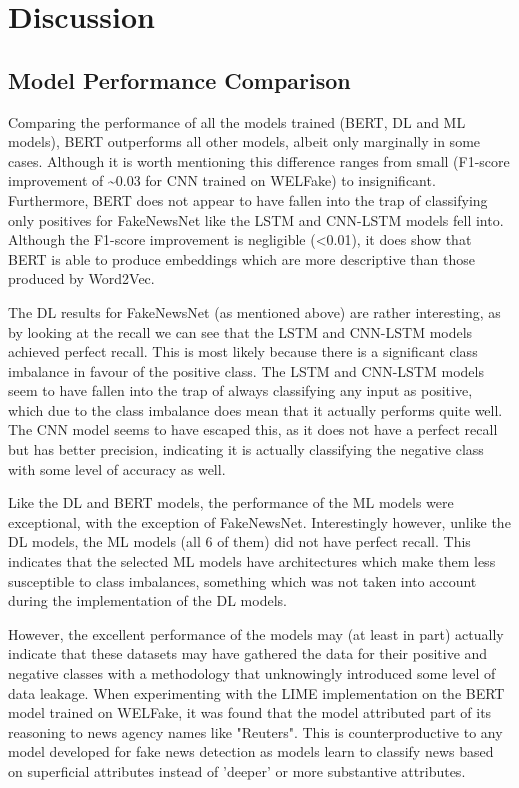\documentclass[stu,12pt,floatsintext,donotrepeattitle]{apa7}
\begin{document}
\section{Discussion}

\subsection{Model Performance Comparison}
Comparing the performance of all the models trained (BERT, DL and ML models), BERT outperforms all other models, albeit only marginally in some cases. Although it is worth mentioning this difference ranges from small (F1-score improvement of {\textasciitilde}0.03 for CNN trained on WELFake) to insignificant. Furthermore, BERT does not appear to have fallen into the trap of classifying only positives for FakeNewsNet like the LSTM and CNN-LSTM models fell into. Although the F1-score improvement is negligible (\textless{}0.01), it does show that BERT is able to produce embeddings which are more descriptive than those produced by Word2Vec. 

The DL results for FakeNewsNet (as mentioned above) are rather interesting, as by looking at the recall we can see that the LSTM and CNN-LSTM models achieved perfect recall. This is most likely because there is a significant class imbalance in favour of the positive class. The LSTM and CNN-LSTM models seem to have fallen into the trap of always classifying any input as positive, which due to the class imbalance does mean that it actually performs quite well. The CNN model seems to have escaped this, as it does not have a perfect recall but has better precision, indicating it is actually classifying the negative class with some level of accuracy as well. 

Like the DL and BERT models, the performance of the ML models were exceptional, with the exception of FakeNewsNet. Interestingly however, unlike the DL models, the ML models (all 6 of them) did not have perfect recall. This indicates that the selected ML models have architectures which make them less susceptible to class imbalances, something which was not taken into account during the implementation of the DL models. 

However, the excellent performance of the models may (at least in part) actually indicate that these datasets may have gathered the data for their positive and negative classes with a methodology that unknowingly introduced some level of data leakage. When experimenting with the LIME implementation on the BERT model trained on WELFake, it was found that the model attributed part of its reasoning to news agency names like "Reuters". This is counterproductive to any model developed for fake news detection as models learn to classify news based on superficial attributes instead of 'deeper' or more substantive attributes. 
\end{document}
